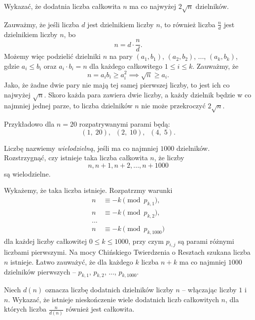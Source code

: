 \newpage
{}

\begin{problem}{1}
	Wykazać, że dodatnia liczba całkowita $n$ ma co najwyżej $2\sqrt{n}$ dzielników.
\end{problem}

\noindent
Zauważmy, że jeśli liczba $d$ jest dzielnikiem liczby $n$, to również liczba $\frac{n}{d}$ jest dzielnikiem liczby $n$, bo
\[
	n = d \cdot \frac{n}{d}.
\]
Możemy więc podzielić dzielniki $n$ na pary $(a_1, b_1)$, $(a_2, b_2)$, ..., $(a_k, b_k)$, gdzie $a_i \leqslant b_i$ oraz $a_i \cdot b_i = n$ dla każdego całkowitego $1 \leqslant i \leqslant k$. Zauważmy, że
\[
	n = a_ib_i \geqslant a_i^2 \implies \sqrt{n} \geqslant a_i.
\]
Jako, że żadne dwie pary nie mają tej samej pierwszej liczby, to jest ich co najwyżej $\sqrt{n}$. Skoro każda para zawiera dwie liczby, a każdy dzielnik będzie w co najmniej jednej parze, to liczba dzielników $n$ nie może przekroczyć $2\sqrt{n}$.

\vspace{10px}
\noindent
Przykładowo dla $n = 20$ rozpatrywanymi parami będą:
\[
	(1,\; 20), \;\; (2,\; 10), \;\; (4,\; 5).
\]

\begin{problem}{2}
	Liczbę nazwiemy \textit{wielodzielną}, jeśli ma co najmniej $1000$ dzielników. Rozstrzygnąć, czy istnieje taka liczba całkowita $n$, że liczby
	\[
		n, n + 1, n + 2, ..., n + 1000
	\]
	są wielodzielne.
\end{problem}

\noindent
Wykażemy, że taka liczba istnieje. Rozpatrzmy warunki
\begin{align*}
	n &\equiv -k \pmod{p_{k, 1}}, \\
	n &\equiv -k \pmod{p_{k, 2}}, \\
	... \\
	n &\equiv -k \pmod{p_{k, 1000}}
\end{align*}
dla każdej liczby całkowitej $0 \leqslant k \leqslant 1000$, przy czym $p_{i, j}$ są parami różnymi liczbami pierwszymi. Na mocy Chińskiego Twierdzenia o Resztach szukana liczba $n$ istnieje. Łatwo zauważyć, że dla każdego $k$ liczba $n + k$ ma co najmniej $1000$ dzielników pierwszych -- $p_{k, 1}$, $p_{k, 2}$, ..., $p_{k, 1000}$.

\begin{problem}{3}
	Niech $d(n)$ oznacza liczbę dodatnich dzielników liczby $n$ -- włączając liczby $1$ i $n$. Wykazać, że istnieje nieskończenie wiele dodatnich liczb całkowitych $n$, dla których liczba $\frac{n}{d(n)}$ również jest całkowita.
\end{problem}

